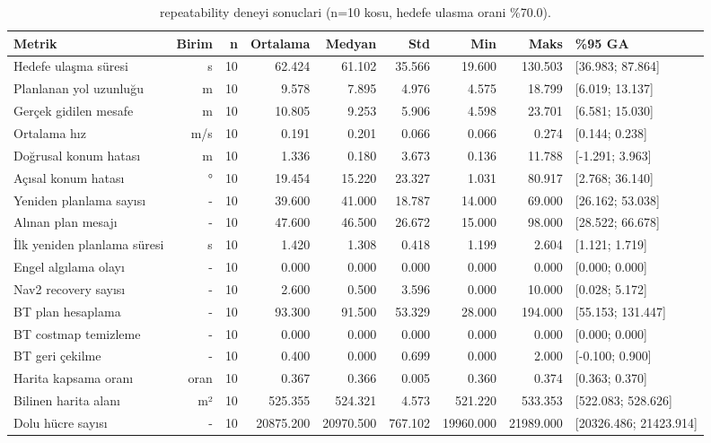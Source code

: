 \begin{table}[htbp]
\centering
\caption{repeatability deneyi sonuclari (n=10 kosu, hedefe ulasma orani \%70.0).}
\label{tab:benchmark-repeatability}
\begin{tabular}{lrrrrrrrl}
\toprule
Metrik & Birim & n & Ortalama & Medyan & Std & Min & Maks & \%95 GA \\
\midrule
Hedefe ulaşma süresi & s & 10 & 62.424 & 61.102 & 35.566 & 19.600 & 130.503 & [36.983; 87.864] \\
Planlanan yol uzunluğu & m & 10 & 9.578 & 7.895 & 4.976 & 4.575 & 18.799 & [6.019; 13.137] \\
Gerçek gidilen mesafe & m & 10 & 10.805 & 9.253 & 5.906 & 4.598 & 23.701 & [6.581; 15.030] \\
Ortalama hız & m/s & 10 & 0.191 & 0.201 & 0.066 & 0.066 & 0.274 & [0.144; 0.238] \\
Doğrusal konum hatası & m & 10 & 1.336 & 0.180 & 3.673 & 0.136 & 11.788 & [-1.291; 3.963] \\
Açısal konum hatası & ° & 10 & 19.454 & 15.220 & 23.327 & 1.031 & 80.917 & [2.768; 36.140] \\
Yeniden planlama sayısı & - & 10 & 39.600 & 41.000 & 18.787 & 14.000 & 69.000 & [26.162; 53.038] \\
Alınan plan mesajı & - & 10 & 47.600 & 46.500 & 26.672 & 15.000 & 98.000 & [28.522; 66.678] \\
İlk yeniden planlama süresi & s & 10 & 1.420 & 1.308 & 0.418 & 1.199 & 2.604 & [1.121; 1.719] \\
Engel algılama olayı & - & 10 & 0.000 & 0.000 & 0.000 & 0.000 & 0.000 & [0.000; 0.000] \\
Nav2 recovery sayısı & - & 10 & 2.600 & 0.500 & 3.596 & 0.000 & 10.000 & [0.028; 5.172] \\
BT plan hesaplama & - & 10 & 93.300 & 91.500 & 53.329 & 28.000 & 194.000 & [55.153; 131.447] \\
BT costmap temizleme & - & 10 & 0.000 & 0.000 & 0.000 & 0.000 & 0.000 & [0.000; 0.000] \\
BT geri çekilme & - & 10 & 0.400 & 0.000 & 0.699 & 0.000 & 2.000 & [-0.100; 0.900] \\
Harita kapsama oranı & oran & 10 & 0.367 & 0.366 & 0.005 & 0.360 & 0.374 & [0.363; 0.370] \\
Bilinen harita alanı & m² & 10 & 525.355 & 524.321 & 4.573 & 521.220 & 533.353 & [522.083; 528.626] \\
Dolu hücre sayısı & - & 10 & 20875.200 & 20970.500 & 767.102 & 19960.000 & 21989.000 & [20326.486; 21423.914] \\
\bottomrule
\end{tabular}
\end{table}

